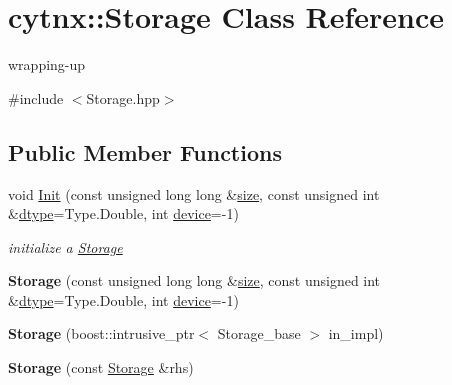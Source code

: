 \hypertarget{classcytnx_1_1Storage}{}\section{cytnx\+:\+:Storage Class Reference}
\label{classcytnx_1_1Storage}


wrapping-\/up  




{\ttfamily \#include $<$Storage.\+hpp$>$}

\subsection*{Public Member Functions}
\begin{DoxyCompactItemize}
\item 
void \hyperlink{classcytnx_1_1Storage_a6cf79f362c4ae68ab7623f0ebac9355e}{Init} (const unsigned long long \&\hyperlink{classcytnx_1_1Storage_aaf36262622abdab03c90b713c454f78e}{size}, const unsigned int \&\hyperlink{classcytnx_1_1Storage_a643824801e81ab86aca055f1dd1f34d7}{dtype}=Type.\+Double, int \hyperlink{classcytnx_1_1Storage_a4c3e27582d7f951e6b76ccbb92f7c537}{device}=-\/1)
\begin{DoxyCompactList}\small\item\em initialize a \hyperlink{classcytnx_1_1Storage}{Storage} \end{DoxyCompactList}\item 
\mbox{\label{classcytnx_1_1Storage_a281c06bd64e9ea3338083c18c4c32eda}} 
{\bfseries Storage} (const unsigned long long \&\hyperlink{classcytnx_1_1Storage_aaf36262622abdab03c90b713c454f78e}{size}, const unsigned int \&\hyperlink{classcytnx_1_1Storage_a643824801e81ab86aca055f1dd1f34d7}{dtype}=Type.\+Double, int \hyperlink{classcytnx_1_1Storage_a4c3e27582d7f951e6b76ccbb92f7c537}{device}=-\/1)
\item 
\mbox{\label{classcytnx_1_1Storage_ab602ecd72e5fc4224922a6b6212ff120}} 
{\bfseries Storage} (boost\+::intrusive\+\_\+ptr$<$ Storage\+\_\+base $>$ in\+\_\+impl)
\item 
\mbox{\label{classcytnx_1_1Storage_a095c6d65c93d237ad4d94cf241b1555e}} 
{\bfseries Storage} (const \hyperlink{classcytnx_1_1Storage}{Storage} \&rhs)
\item 
\mbox{\label{classcytnx_1_1Storage_a1ee2ea67e2197bc9d690ca8a1b878f73}} 

\end{DoxyCompactItemize}
